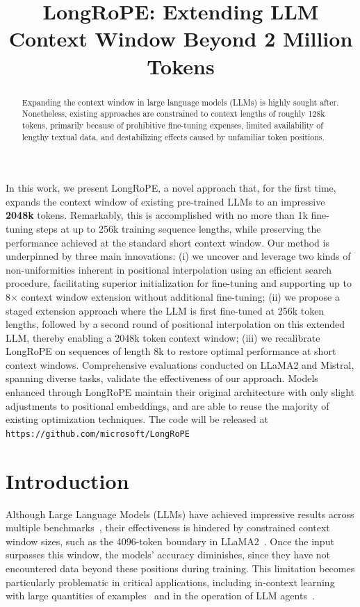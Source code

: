\title{LongRoPE: Extending LLM Context Window Beyond 2 Million Tokens}

\begin{abstract}
Expanding the context window in large language models (LLMs) is highly sought after. Nonetheless, existing approaches are constrained to context lengths of roughly 128k tokens, primarily because of prohibitive fine-tuning expenses, limited availability of lengthy textual data, and destabilizing effects caused by unfamiliar token positions.
\end{abstract}

In this work, we present LongRoPE, a novel approach that, for the first time, expands the context window of existing pre-trained LLMs to an impressive \textbf{2048k} tokens. Remarkably, this is accomplished with no more than 1k fine-tuning steps at up to 256k training sequence lengths, while preserving the performance achieved at the standard short context window. Our method is underpinned by three main innovations: (i) we uncover and leverage two kinds of non-uniformities inherent in positional interpolation using an efficient search procedure, facilitating superior initialization for fine-tuning and supporting up to 8$\times$ context window extension without additional fine-tuning; (ii) we propose a staged extension approach where the LLM is first fine-tuned at 256k token lengths, followed by a second round of positional interpolation on this extended LLM, thereby enabling a 2048k token context window; (iii) we recalibrate LongRoPE on sequences of length 8k to restore optimal performance at short context windows. Comprehensive evaluations conducted on LLaMA2 and Mistral, spanning diverse tasks, validate the effectiveness of our approach. Models enhanced through LongRoPE maintain their original architecture with only slight adjustments to positional embeddings, and are able to reuse the majority of existing optimization techniques. The code will be released at \texttt{https://github.com/microsoft/LongRoPE}

\section{Introduction}

Although Large Language Models (LLMs) have achieved impressive results across multiple benchmarks~\cite{gpt4,llama2}, their effectiveness is hindered by constrained context window sizes, such as the 4096-token boundary in LLaMA2~\cite{llama2}. Once the input surpasses this window, the models' accuracy diminishes, since they have not encountered data beyond these positions during training. This limitation becomes particularly problematic in critical applications, including in-context learning with large quantities of examples~\cite{Huang2023FewerIM} and in the operation of LLM agents~\cite{park2023generative,madaan2023selfrefine}.

